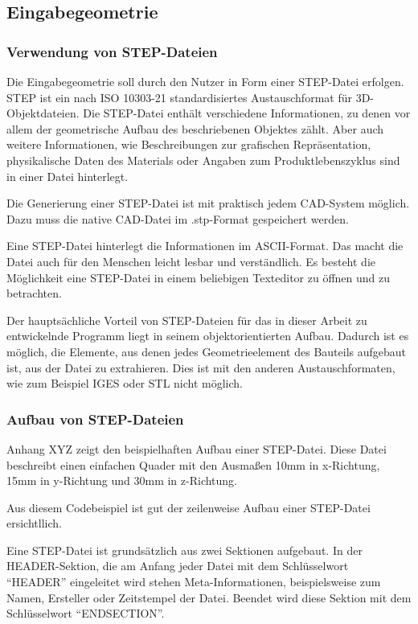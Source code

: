 \subsection{Eingabegeometrie} 

\subsubsection{Verwendung von STEP-Dateien}
 
Die Eingabegeometrie soll durch den Nutzer in Form einer STEP-Datei erfolgen. STEP ist ein nach ISO 10303-21 standardisiertes Austauschformat für 3D-Objektdateien. Die STEP-Datei enthält verschiedene Informationen, zu denen vor allem der geometrische Aufbau des beschriebenen Objektes zählt. Aber auch weitere Informationen, wie Beschreibungen zur grafischen Repräsentation, physikalische Daten des Materials oder Angaben zum Produktlebenszyklus sind in einer Datei hinterlegt. 

Die Generierung einer STEP-Datei ist mit praktisch jedem CAD-System möglich. Dazu muss die native CAD-Datei im .stp-Format gespeichert werden.

Eine STEP-Datei hinterlegt die Informationen im ASCII-Format. Das macht die Datei auch für den Menschen leicht lesbar und verständlich. Es besteht die Möglichkeit eine STEP-Datei in einem beliebigen Texteditor zu öffnen und zu betrachten. 

Der hauptsächliche Vorteil von STEP-Dateien für das in dieser Arbeit zu entwickelnde Programm liegt in seinem objektorientierten Aufbau. Dadurch ist es möglich, die Elemente, aus denen jedes Geometrieelement des Bauteils aufgebaut ist, aus der Datei zu extrahieren. Dies ist mit den anderen Austauschformaten, wie zum Beispiel IGES oder STL nicht möglich. 

\subsubsection{Aufbau von STEP-Dateien}

Anhang XYZ zeigt den beispielhaften Aufbau einer STEP-Datei. Diese Datei beschreibt einen einfachen Quader mit den Ausmaßen 10mm in x-Richtung, 15mm in y-Richtung und 30mm in z-Richtung. 

Aus diesem Codebeispiel ist gut der zeilenweise Aufbau einer STEP-Datei ersichtllich. 

Eine STEP-Datei ist grundsätzlich aus zwei Sektionen aufgebaut. 
In der HEADER-Sektion, die am Anfang jeder Datei mit dem Schlüsselwort "`HEADER"' eingeleitet wird stehen Meta-Informationen, beispielsweise zum Namen, Ersteller oder Zeitstempel der Datei. Beendet wird diese Sektion mit dem Schlüsselwort "`ENDSECTION"'.

